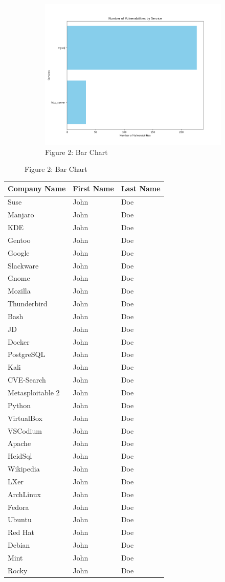 \documentclass[a4paper, 12pt]{article}
\begin{document}
{\begin{figure}[htbp]
        \begin{subfigure}{\textwidth} %
            \centering
            \includegraphics[width=0.9\linewidth]{alvo_bar_chart.png} %
            \caption{Figure 2: Bar Chart}
        \end{subfigure}
    \end{figure}
    \restoregeometry %
}

\begin{longtable}[]{@{}lll@{}}
\toprule
Company Name & First Name & Last Name\tabularnewline
\midrule
\endhead
Suse & John & Doe\tabularnewline
Manjaro & John & Doe\tabularnewline
KDE & John & Doe\tabularnewline
Gentoo & John & Doe\tabularnewline
Google & John & Doe\tabularnewline
Slackware & John & Doe\tabularnewline
Gnome & John & Doe\tabularnewline
Mozilla & John & Doe\tabularnewline
Thunderbird & John & Doe\tabularnewline
Bash & John & Doe\tabularnewline
JD & John & Doe\tabularnewline
Docker & John & Doe\tabularnewline
PostgreSQL & John & Doe\tabularnewline
Kali & John & Doe\tabularnewline
CVE-Search & John & Doe\tabularnewline
Metasploitable 2 & John & Doe\tabularnewline
Python & John & Doe\tabularnewline
VirtualBox & John & Doe\tabularnewline
VSCodium & John & Doe\tabularnewline
Apache & John & Doe\tabularnewline
HeidSql & John & Doe\tabularnewline
Wikipedia & John & Doe\tabularnewline
LXer & John & Doe\tabularnewline
ArchLinux & John & Doe\tabularnewline
Fedora & John & Doe\tabularnewline
Ubuntu & John & Doe\tabularnewline
Red Hat & John & Doe\tabularnewline
Debian & John & Doe\tabularnewline
Mint & John & Doe\tabularnewline
Rocky & John & Doe\tabularnewline
\bottomrule
\end{longtable}
\end{document}
